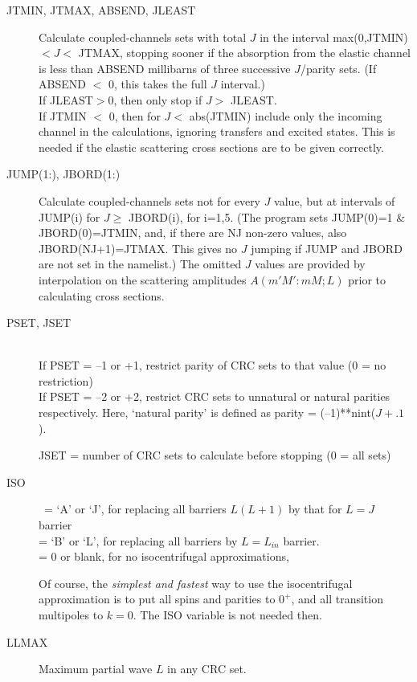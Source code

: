 \documentclass[11pt]{article}
\begin{document}
\begin{description}

\item[JTMIN, JTMAX, ABSEND, JLEAST]
Calculate coupled-channels sets with total $J$ in the interval
max(0,JTMIN) $ < J  <$ JTMAX,
stopping sooner if the absorption from the elastic channel
is less than ABSEND millibarns of three successive $J$/parity sets.
(If ABSEND $<$ 0, this takes the full $J$ interval.)\\
If JLEAST$>0$, then only stop if $J>$ JLEAST.
\\
If JTMIN $<$ 0, then for $J <$ abs(JTMIN) include only the incoming channel
in the calculations, ignoring transfers and excited states.
This is needed if the elastic scattering cross sections are to be given
correctly.



\item[JUMP(1:), JBORD(1:)]
Calculate coupled-channels sets not for every $J$
value, but at intervals of JUMP(i) for  $J\geq$ JBORD(i), for i=1,5.
(The program sets JUMP(0)=1 \& JBORD(0)=JTMIN, and, 
if there are NJ non-zero values, also JBORD(NJ+1)=JTMAX.  
This gives no $J$ jumping if JUMP and JBORD are not set in the namelist.)
The omitted $J$ values are provided by interpolation on the scattering
amplitudes $A(m'M':mM; L)$ prior to calculating cross sections.

\item[PSET, JSET] ~\\
If PSET =  --1 or +1,  restrict parity of CRC sets to that value (0 = no restriction)\\
If PSET = --2 or +2, restrict CRC sets to unnatural or natural parities respectively. Here, `natural parity' is defined as parity = (--1)**nint($J+.1$). 

JSET = number of CRC sets to calculate before stopping (0 = all sets)

\item[ISO]
\ = `A' or `J', for replacing all barriers $L(L+1)$ by that for $L = J$ barrier
\\ = `B' or `L', for replacing all barriers by $L = L_{in}$ barrier.
 \\ = 0 or blank, for no isocentrifugal approximations,

Of course, the {\em simplest and fastest} way to use the isocentrifugal
approximation is to put all spins and parities to $0^+$, and all
transition multipoles to $k=0$. The ISO variable is not needed then.

\item[LLMAX] Maximum partial wave $L$ in any CRC set.
\end{description}
\end{document}
